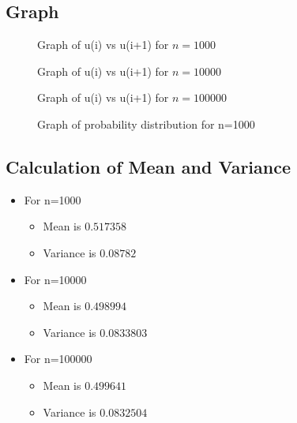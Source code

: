 \documentclass[10pt]{article}
\begin{document}
\subsection{Graph}
	\begin{figure}[H]
       	     	\centering
		\caption{Graph of u(i) vs u(i+1) for $  n =  1000  $}	
		\label{3:q3_f1_a}
	\end{figure}
	\begin{figure}[H]
       	     	\centering
		\caption{Graph of u(i)  vs  u(i+1) for $   n =  10000 $}	
		\label{3:q3_f1_b}
	\end{figure}
	\begin{figure}[H]
       	     	\centering
		\caption{Graph of u(i)  vs u(i+1) for $ n = 100000  $}	
		\label{3:q3_f1_c}
	\end{figure}
	\begin{figure}[H]
       	     	\centering
		\caption{Graph of probability distribution for n=1000}	
		\label{3:q3_f1_a}
	\end{figure}
\subsection{Calculation of Mean and Variance}
\begin{itemize}
\item For n=1000
\begin{itemize}
\item Mean is  $ 0.517358$
\item Variance is  $ 0.08782$
\end{itemize}
\item For n=10000
\begin{itemize}
\item Mean is  $ 0.498994$
\item Variance is  $ 0.0833803$
\end{itemize}
\item For n=100000 
\begin{itemize}
\item Mean is  $ 0.499641$
\item Variance is  $ 0.0832504$
\end{itemize}
\end{itemize}
\end{document}
